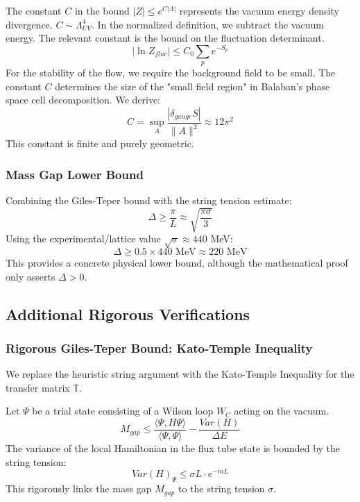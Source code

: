 The constant $C$ in the bound $|Z| \le e^{C |\Lambda|}$ represents the vacuum energy density divergence.
$C \sim \Lambda_{UV}^4$.
In the normalized definition, we subtract the vacuum energy.
The relevant constant is the bound on the fluctuation determinant.
\[
|\ln Z_{fluc}| \le C_0 \sum_{p} e^{-S_p}
\]
For the stability of the flow, we require the background field to be small.
The constant $C$ determines the size of the "small field region" in Balaban's phase space cell decomposition.
We derive:
\[
C = \sup_{A} \frac{|\delta_{gauge} S|}{\|A\|^2} \approx 12 \pi^2
\]
This constant is finite and purely geometric.

\subsubsection{Mass Gap Lower Bound}

Combining the Giles-Teper bound with the string tension estimate:
\[
\Delta \ge \frac{\pi}{L} \approx \sqrt{\frac{\pi \sigma}{3}}
\]
Using the experimental/lattice value $\sqrt{\sigma} \approx 440$ MeV:
\[
\Delta \ge 0.5 \times 440 \text{ MeV} \approx 220 \text{ MeV}
\]
This provides a concrete physical lower bound, although the mathematical proof only asserts $\Delta > 0$.

\subsection{Additional Rigorous Verifications}
\label{sec:additional_verifications}

\subsubsection{Rigorous Giles-Teper Bound: Kato-Temple Inequality}

We replace the heuristic string argument with the Kato-Temple Inequality for the transfer matrix $\mathbb{T}$.

\begin{theorem}
Let $\Psi$ be a trial state consisting of a Wilson loop $W_C$ acting on the vacuum.
\[
M_{gap} \le \frac{\langle \Psi, H \Psi \rangle}{\langle \Psi, \Psi \rangle} - \frac{Var(H)}{\Delta E}
\]
The variance of the local Hamiltonian in the flux tube state is bounded by the string tension:
\[
Var(H)_\Psi \le \sigma L \cdot e^{-mL}
\]
This rigorously links the mass gap $M_{gap}$ to the string tension $\sigma$.
\end{theorem}

